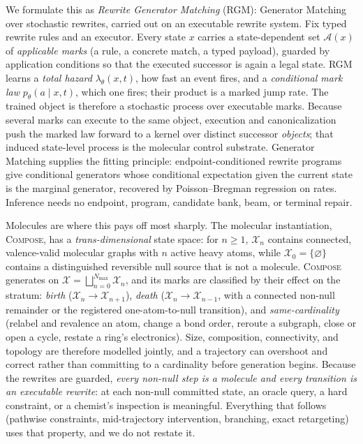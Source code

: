 \documentclass{article}
\newcommand{\method}{\textsc{Compose}\xspace}
\newcommand{\rgm}{\textsc{RGM}\xspace}
\newcommand{\A}{\mathcal{A}}
\newcommand{\X}{\mathcal{X}}
\theoremstyle{definition}
\theoremstyle{remark}
\begin{document}
We formulate this as \emph{Rewrite Generator Matching} (\rgm): Generator Matching over stochastic rewrites, carried out on an executable rewrite system. Fix typed rewrite rules and an executor. Every state $x$ carries a state-dependent set $\A(x)$ of \emph{applicable marks} (a rule, a concrete match, a typed payload), guarded by application conditions so that the executed successor is again a legal state. \rgm learns a \emph{total hazard} $\lambda_\theta(x,t)$, how fast an event fires, and a \emph{conditional mark law} $p_\theta(a\mid x,t)$, which one fires; their product is a marked jump rate. The trained object is therefore a stochastic process over executable marks. Because several marks can execute to the same object, execution and canonicalization push the marked law forward to a kernel over distinct successor \emph{objects}; that induced state-level process is the molecular control substrate. Generator Matching \citep{holderrieth2025generator} supplies the fitting principle: endpoint-conditioned rewrite programs give conditional generators whose conditional expectation given the current state is the marginal generator, recovered by Poisson--Bregman regression on rates. Inference needs no endpoint, program, candidate bank, beam, or terminal repair.

Molecules are where this pays off most sharply. The molecular instantiation, \method, has a \emph{trans-dimensional} state space: for $n\ge1$, $\X_n$ contains connected, valence-valid molecular graphs with $n$ active heavy atoms, while $\X_0=\{\varnothing\}$ contains a distinguished reversible null source that is not a molecule. \method generates on $\X=\bigsqcup_{n=0}^{N_{\max}}\X_n$, and its marks are classified by their effect on the stratum: \emph{birth} ($\X_n\to\X_{n+1}$), \emph{death} ($\X_n\to\X_{n-1}$, with a connected non-null remainder or the registered one-atom-to-null transition), and \emph{same-cardinality} (relabel and revalence an atom, change a bond order, reroute a subgraph, close or open a cycle, restate a ring's electronics). Size, composition, connectivity, and topology are therefore modelled jointly, and a trajectory can overshoot and correct rather than committing to a cardinality before generation begins. Because the rewrites are guarded, \emph{every non-null step is a molecule and every transition is an executable rewrite}: at each non-null committed state, an oracle query, a hard constraint, or a chemist's inspection is meaningful. Everything that follows (pathwise constraints, mid-trajectory intervention, branching, exact retargeting) uses that property, and we do not restate it.
\end{document}
